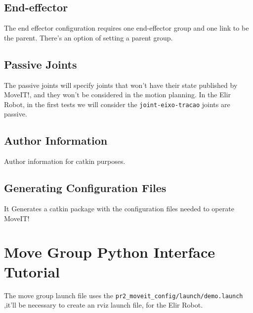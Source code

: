 \documentclass[12pt, a4paper, oneside]{article}
\begin{document}
	\subsection{End-effector}
	The end effector configuration requires one end-effector group and one link to be the parent.
	There's an option of setting a parent group.
	
	\subsection{Passive Joints}
	The passive joints will specify joints that won't have their state published by MoveIT!, and they won't be considered in the motion planning. In the Elir Robot, in the first tests we will consider the \verb|joint-eixo-tracao| joints are passive.
	
	\subsection{Author Information}
	Author information for catkin purposes.
	
	\subsection{Generating Configuration Files}
	It Generates a catkin package with the configuration files needed to operate MoveIT!
	
	\section{Move Group Python Interface Tutorial}
	The move group launch file uses the  \verb|pr2_moveit_config/launch/demo.launch| ,it'll be necessary to create an rviz launch file, for the Elir Robot. 
	
	
\end{document}
